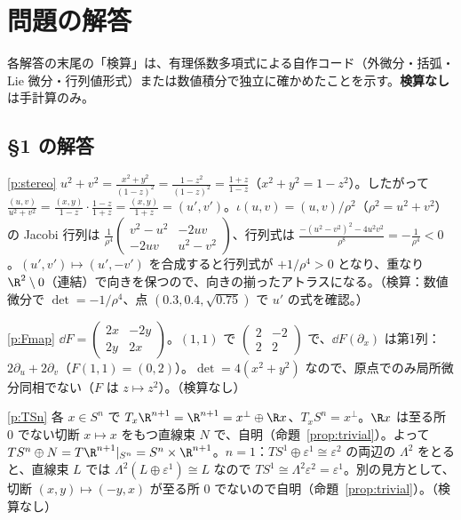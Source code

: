 
\section{問題の解答}
\noindent 各解答の末尾の「検算」は、有理係数多項式による自作コード（外微分・括弧・Lie 微分・行列値形式）または数値積分で独立に確かめたことを示す。\textbf{検算なし}は手計算のみ。

\subsection*{§1 の解答}
\begin{sol}{\ref{p:stereo}}
$u^2+v^2=\frac{x^2+y^2}{(1-z)^2}=\frac{1-z^2}{(1-z)^2}=\frac{1+z}{1-z}$（$x^2+y^2=1-z^2$）。したがって $\frac{(u,v)}{u^2+v^2}=\frac{(x,y)}{1-z}\cdot\frac{1-z}{1+z}=\frac{(x,y)}{1+z}=(u',v')$。$\iota(u,v)=(u,v)/\rho^2$（$\rho^2=u^2+v^2$）の Jacobi 行列は
$\frac1{\rho^4}\begin{pmatrix}v^2-u^2&-2uv\\-2uv&u^2-v^2\end{pmatrix}$、行列式は $\frac{-(u^2-v^2)^2-4u^2v^2}{\rho^8}=-\frac1{\rho^4}<0$。$(u',v')\mapsto(u',-v')$ を合成すると行列式が $+1/\rho^4>0$ となり、重なり $\R^2\setminus0$（連結）で向きを保つので、向きの揃ったアトラスになる。（検算：数値微分で $\det=-1/\rho^4$、点 $(0.3,0.4,\sqrt{0.75})$ で $u'$ の式を確認。）
\end{sol}
\begin{sol}{\ref{p:Fmap}}
$\dd F=\begin{pmatrix}2x&-2y\\2y&2x\end{pmatrix}$。$(1,1)$ で $\begin{pmatrix}2&-2\\2&2\end{pmatrix}$ で、$\dd F(\partial_x)$ は第1列：$2\partial_u+2\partial_v$（$F(1,1)=(0,2)$）。$\det=4(x^2+y^2)$ なので、原点でのみ局所微分同相でない（$F$ は $z\mapsto z^2$）。（検算なし）
\end{sol}
\begin{sol}{\ref{p:TSn}}
各 $x\in S^n$ で $T_x\R^{n+1}=\R^{n+1}=x^\perp\oplus\R x$、$T_xS^n=x^\perp$。$\R x$ は至る所 $0$ でない切断 $x\mapsto x$ をもつ直線束 $N$ で、自明（命題~\ref{prop:trivial}）。よって $TS^n\oplus N=T\R^{n+1}|_{S^n}=S^n\times\R^{n+1}$。$n=1$：$TS^1\oplus\varepsilon^1\cong\varepsilon^2$ の両辺の $\Lambda^2$ をとると、直線束 $L$ では $\Lambda^2(L\oplus\varepsilon^1)\cong L$ なので $TS^1\cong\Lambda^2\varepsilon^2=\varepsilon^1$。別の見方として、切断 $(x,y)\mapsto(-y,x)$ が至る所 $0$ でないので自明（命題~\ref{prop:trivial}）。（検算なし）
\end{sol}
